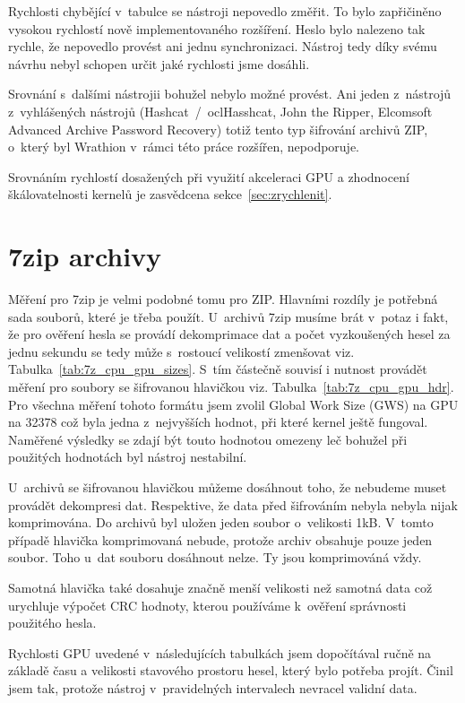 Rychlosti chybějící v~tabulce se nástroji nepovedlo změřit. To bylo zapřičiněno vysokou rychlostí
nově implementovaného rozšíření. Heslo bylo nalezeno tak rychle, že nepovedlo provést ani jednu
synchronizaci. Nástroj tedy díky svému návrhu nebyl schopen určit jaké rychlosti jsme dosáhli.

Srovnání s~dalšími nástrojii bohužel nebylo možné provést. Ani jeden z~nástrojů z~vyhlášených
nástrojů (Hashcat~/~oclHasshcat, John the Ripper, Elcomsoft Advanced Archive Password Recovery)
totiž tento typ šifrování archivů ZIP, o~který byl Wrathion v~rámci této práce rozšířen,
nepodporuje.

Srovnáním rychlostí dosažených při využití akceleraci GPU a zhodnocení škálovatelnosti kernelů je zasvědcena sekce~\ref{sec:zrychlenit}. 

\section{7zip archivy}
Měření pro 7zip je velmi podobné tomu pro ZIP. Hlavními rozdíly je potřebná sada souborů, které
je třeba použít. U~archivů 7zip musíme brát v~potaz i fakt, že pro ověření hesla se provádí
dekomprimace dat a počet vyzkoušených hesel za jednu sekundu se tedy může s~rostoucí velikostí
zmenšovat viz. Tabulka~\ref{tab:7z_cpu_gpu_sizes}. S~tím částečně souvisí i nutnost provádět
měření pro soubory se šifrovanou hlavičkou viz. Tabulka~\ref{tab:7z_cpu_gpu_hdr}. Pro všechna
měření tohoto formátu jsem zvolil Global Work Size (GWS) na GPU na 32378 což byla jedna
z~nejvyšších hodnot, při které kernel ještě fungoval. Naměřené výsledky se zdají být touto hodnotou
omezeny leč bohužel při použitých hodnotách byl nástroj nestabilní.

U~archivů se šifrovanou hlavičkou můžeme dosáhnout toho, že nebudeme muset provádět dekompresi
dat. Respektive, že data před šifrováním nebyla nebyla nijak komprimována. Do archivů byl uložen
jeden soubor o~velikosti 1kB. V~tomto případě hlavička komprimovaná nebude, protože archiv
obsahuje pouze jeden soubor. Toho u~dat souboru dosáhnout nelze. Ty jsou komprimováná vždy.

Samotná hlavička také dosahuje značně menší velikosti než samotná data což urychluje výpočet CRC
hodnoty, kterou používáme k~ověření správnosti použitého hesla.

Rychlosti GPU uvedené v~následujících tabulkách jsem dopočítával ručně na základě času a
velikosti stavového prostoru hesel, který bylo potřeba projít. Činil jsem tak, protože nástroj
v~pravidelných intervalech nevracel validní data.

